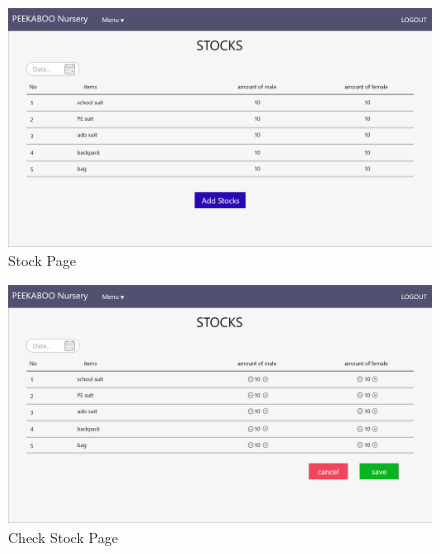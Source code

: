 \begin{figure}
  \begin{center}
  \includegraphics[width=\linewidth]{images/stockPage.png}
  \end{center}
  \caption[Poem]{Stock Page}
  \label{fig:Stock}
  \end{figure}

\begin{figure}
  \begin{center}
  \includegraphics[width=\linewidth]{images/stockPageChecking.png}
  \end{center}
  \caption[Poem]{Check Stock Page}
  \label{fig:CheckStock}
  \end{figure}

